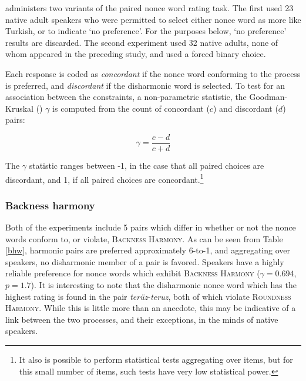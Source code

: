 \citet{Zimmer1969} administers two variants of the paired nonce word rating task. The first used 23 native adult speakers who were permitted to select either nonce word as more like Turkish, or to indicate `no preference'. For the purposes below, `no preference' results are discarded. The second experiment used 32 native adults, none of whom appeared in the preceding study, and used a forced binary choice.

Each response is coded as \emph{concordant} if the nonce word conforming to the process is preferred, and \emph{discordant} if the disharmonic word is selected. To test for an association between the constraints, a non-parametric statistic, the Goodman-Kruskal (\citeyear{Goodman1954}) $\gamma$ is computed from the count of concordant ($c$) and discordant ($d$) pairs:

\begin{equation*}
\displaystyle \gamma = \frac{c - d}{c + d}
\end{equation*}

\noindent
The $\gamma$ statistic ranges between -1, in the case that all paired choices are discordant, and 1, if all paired choices are concordant.\footnote{It also is possible to perform statistical tests aggregating over items, but for this small number of items, such tests have very low statistical power.}

\subsubsection{Backness harmony}

Both of the \citet{Zimmer1969} experiments include 5 pairs which differ in whether or not the nonce words conform to, or violate, \textsc{Backness Harmony}. As can be seen from Table \ref{bhw}, harmonic pairs are preferred approximately 6-to-1, and aggregating over speakers, no disharmonic member of a pair is favored. Speakers have a highly reliable preference for nonce words which exhibit \textsc{Backness Harmony} ($\gamma = 0.694$, $p = 1.7$). It is interesting to note that the disharmonic nonce word which has the highest rating is found in the pair \emph{terüz}-\emph{teruz}, both of which violate \textsc{Roundness Harmony}. While this is little more than an anecdote, this may be  indicative of a link between the two processes, and their exceptions, in the minds of native speakers. 

